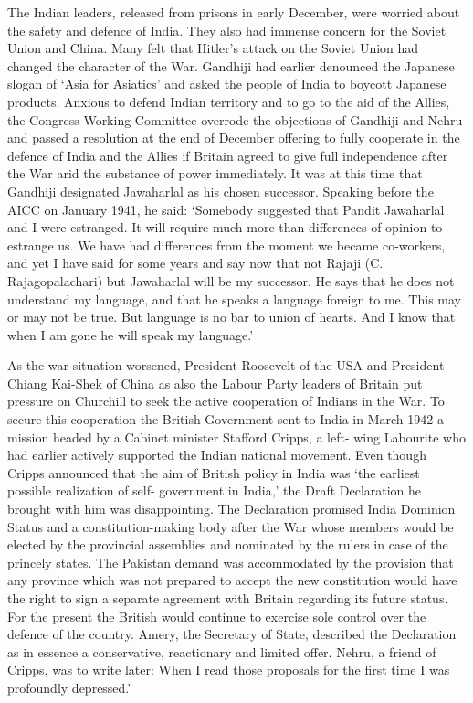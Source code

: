 The Indian leaders, released from prisons in early December, were worried about the safety and defence of India. They also had immense concern for the Soviet Union and China. Many felt that Hitler’s attack on the Soviet Union had changed the character of the War. Gandhiji had earlier denounced the Japanese slogan of ‘Asia for Asiatics’ and asked the people of India to boycott Japanese products. Anxious to defend Indian territory and to go to the aid of the Allies, the Congress Working Committee overrode the objections of Gandhiji and Nehru and passed a resolution at the end of December offering to fully cooperate in the defence of India and the Allies if Britain agreed to give full independence after the War arid the substance of power immediately. It was at this time that Gandhiji designated Jawaharlal as his chosen successor. Speaking before the AICC on January 1941, he said: ‘Somebody suggested that Pandit Jawaharlal and I were estranged. It will require much more than differences of opinion to estrange us. We have had differences from the moment we became co-workers, and yet I have said for some years and say now that not Rajaji (C. Rajagopalachari) but Jawaharlal will be my successor. He says that he does not understand my language, and that he speaks a language foreign to me. This may or may not be true. But language is no bar to union of hearts. And I know that when I am gone he will speak my language.’ 

As the war situation worsened, President Roosevelt of the USA and President Chiang Kai-Shek of China as also the Labour Party leaders of Britain put pressure on Churchill to seek the active cooperation of Indians in the War. To secure this cooperation the British Government sent to India in March 1942 a mission headed by a Cabinet minister Stafford Cripps, a left- wing Labourite who had earlier actively supported the Indian national movement. Even though Cripps announced that the aim of British policy in India was ‘the earliest possible realization of self- government in India,’ the Draft Declaration he brought with him was disappointing. The Declaration promised India Dominion Status and a constitution-making body after the War whose members would be elected by the provincial assemblies and nominated by the rulers in case of the princely states. The Pakistan demand was accommodated by the provision that any province which was not prepared to accept the new constitution would have the right to sign a separate agreement with Britain regarding its future status. For the present the British would continue to exercise sole control over the defence of the country. Amery, the Secretary of State, described the Declaration as in essence a conservative, reactionary and limited offer. Nehru, a friend of Cripps, was to write later: When I read those proposals for the first time I was profoundly depressed.’ 

